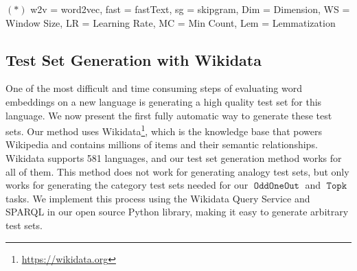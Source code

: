 \documentclass[11pt,a4paper]{article}
\DeclareMathOperator{\OddOneOut}{\texttt{OddOneOut}}
\DeclareMathOperator{\topk}{\texttt{Topk}}
\begin{document}
\begin{table}[t]
    \vspace{0.1in}
    $(*)$ w2v = word2vec, fast = fastText, sg = skipgram, Dim = Dimension, WS = Window Size, LR = Learning Rate, MC = Min Count, Lem = Lemmatization

\caption{
    The optimal hyperparameters selected for training a model on each corpus,
    and their corresponding evaluation metrics.
    ($\texttt{Ave}$ denotes the hyperbolic mean of $\OddOneOut$ and $\topk$.)
    We successfully trained models on 16 of the 18 languages provided by the CLTK library (everything except Malayalam and Classical Arabic).
    Previously, word embeddings had only been trained on Ancient Greek and Latin.
    }
\label{table:language}
\end{table}

\subsection{Test Set Generation with Wikidata}
\label{sec:wikidata}

One of the most difficult and time consuming steps of evaluating word embeddings on a new language is generating a high quality test set for this language.
We now present the first fully automatic way to generate these test sets.
Our method uses Wikidata\footnote{\url{https://wikidata.org}},
which is the knowledge base that powers Wikipedia
and contains millions of items and their semantic relationships.
Wikidata supports 581 languages,
and our test set generation method works for all of them.
This method does not work for generating analogy test sets,
but only works for generating the category test sets needed for our $\OddOneOut$ and $\topk$ tasks.
We implement this process using the Wikidata Query Service and SPARQL in our open source Python library,
making it easy to generate arbitrary test sets.
\end{document}
